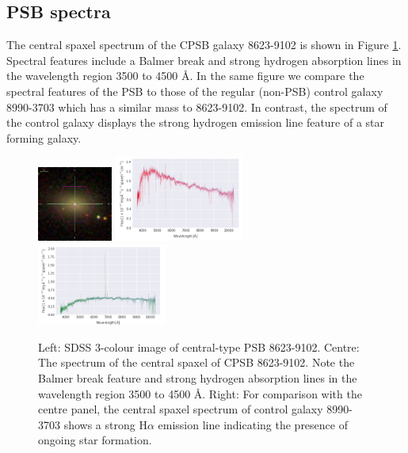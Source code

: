 \subsection{PSB spectra}
The central spaxel spectrum of the CPSB galaxy 8623-9102 is shown in Figure \ref{fig:CPSB-8623-9102-spec}. Spectral features include a Balmer break and strong hydrogen absorption lines in the wavelength region 3500 to 4500 \AA. In the same figure we compare the spectral features of the PSB to those of the regular (non-PSB) control galaxy 8990-3703 which has a similar mass to 8623-9102. In contrast, the spectrum of the control galaxy displays the strong hydrogen emission line feature of a star forming galaxy.

\begin{figure}
    \centering
    \includegraphics[width=0.22\textwidth]{images/Cutouts/CPSB-8623-9102-IM.png}
    \hfill
    \includegraphics[width=0.38\textwidth]{images/Spectra/CPSB-8623-9102.png}
    \hfill
    \includegraphics[width=0.38\textwidth]{images/Spectra/CPSB-CTRL-8990-3703-spec.png}
    \caption[Central spaxel spectrum of CPSB 8623-9102]{Left: SDSS 3-colour image of central-type PSB 8623-9102. 
    Centre: The spectrum of the central spaxel of CPSB  8623-9102. Note the Balmer break feature and strong hydrogen absorption lines in the wavelength region 3500 to 4500 \AA.
    Right: For comparison with the centre panel, the central spaxel spectrum of control galaxy 8990-3703 shows a strong H$\alpha$ emission line indicating the presence of ongoing star formation.}
    \label{fig:CPSB-8623-9102-spec}
\end{figure}


